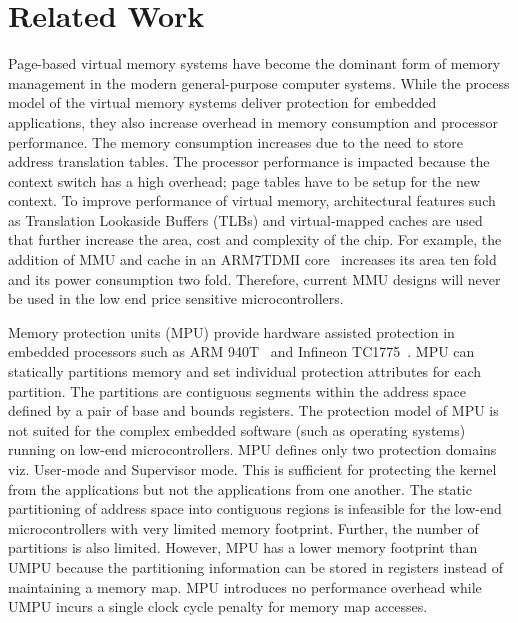 \section{Related Work}
\label{sec:related}
%
Page-based virtual memory systems have become the dominant form of
memory management in the modern general-purpose computer systems.
%
While the process model of the virtual memory systems deliver protection for embedded applications, they also increase overhead in memory consumption and processor performance.
%
The memory consumption increases due to the need to store address translation tables.
%
The processor performance is impacted because the context switch has a high overhead; page tables have to be setup for the new context.
%
To improve performance of virtual memory, architectural features such as Translation Lookaside Buffers (TLBs) and virtual-mapped caches are used that further increase the area, cost and complexity of the chip.
%
For example, the addition of MMU and cache in an ARM7TDMI core~\cite{arm7tdmi} increases its area ten fold and its power consumption two fold. 
%
Therefore, current MMU designs will never be used in the low end price sensitive microcontrollers.

%
Memory protection units (MPU) provide hardware assisted protection in  embedded processors such as ARM
940T~\cite{arm940tds} and Infineon TC1775~\cite{inftc1775ds}.
%
MPU can statically partitions memory and set individual protection attributes for each partition.
%
The partitions are contiguous segments within the address space defined by a pair of base and bounds registers.
%
The protection model of MPU is not suited for the complex embedded
software (such as operating systems) running on low-end microcontrollers.
%
MPU defines only two protection domains viz. User-mode and Supervisor
mode.
%
This is sufficient for protecting the kernel from the applications but
not the applications from one another.
%
The static partitioning of address space into contiguous regions is
infeasible for the low-end microcontrollers with very limited memory
footprint.
%
Further, the number of partitions is also limited.
%
However, MPU has a lower memory footprint than UMPU because the
partitioning information can be stored in registers instead of
maintaining a memory map.
%
MPU introduces no performance overhead while UMPU incurs a single
clock cycle penalty for memory map accesses.
%


